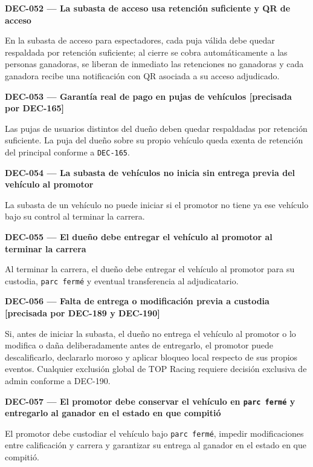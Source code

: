 \documentclass[10pt,letterpaper]{article}
\begin{document}
\noindent\textbf{DEC-052 --- La subasta de acceso usa retención suficiente y QR de acceso}\par
En la subasta de acceso para espectadores, cada puja válida debe quedar respaldada por retención suficiente; al cierre se cobra automáticamente a las personas ganadoras, se liberan de inmediato las retenciones no ganadoras y cada ganadora recibe una notificación con QR asociada a su acceso adjudicado.\par\vspace{0.45em}
\noindent\textbf{DEC-053 --- Garantía real de pago en pujas de vehículos [precisada por DEC-165]}\par
Las pujas de usuarios distintos del dueño deben quedar respaldadas por retención suficiente. La puja del dueño sobre su propio vehículo queda exenta de retención del principal conforme a \texttt{DEC-165}.\par\vspace{0.45em}
\noindent\textbf{DEC-054 --- La subasta de vehículos no inicia sin entrega previa del vehículo al promotor}\par
La subasta de un vehículo no puede iniciar si el promotor no tiene ya ese vehículo bajo su control al terminar la carrera.\par\vspace{0.45em}
\noindent\textbf{DEC-055 --- El dueño debe entregar el vehículo al promotor al terminar la carrera}\par
Al terminar la carrera, el dueño debe entregar el vehículo al promotor para su custodia, \texttt{parc fermé} y eventual transferencia al adjudicatario.\par\vspace{0.45em}
\noindent\textbf{DEC-056 --- Falta de entrega o modificación previa a custodia [precisada por DEC-189 y DEC-190]}\par
Si, antes de iniciar la subasta, el dueño no entrega el vehículo al promotor o lo modifica o daña deliberadamente antes de entregarlo, el promotor puede descalificarlo, declararlo moroso y aplicar bloqueo local respecto de sus propios eventos. Cualquier exclusión global de TOP Racing requiere decisión exclusiva de admin conforme a DEC-190.\par\vspace{0.45em}
\noindent\textbf{DEC-057 --- El promotor debe conservar el vehículo en \texttt{parc fermé} y entregarlo al ganador en el estado en que compitió}\par
El promotor debe custodiar el vehículo bajo \texttt{parc fermé}, impedir modificaciones entre calificación y carrera y garantizar su entrega al ganador en el estado en que compitió.\par\vspace{0.45em}
\end{document}
